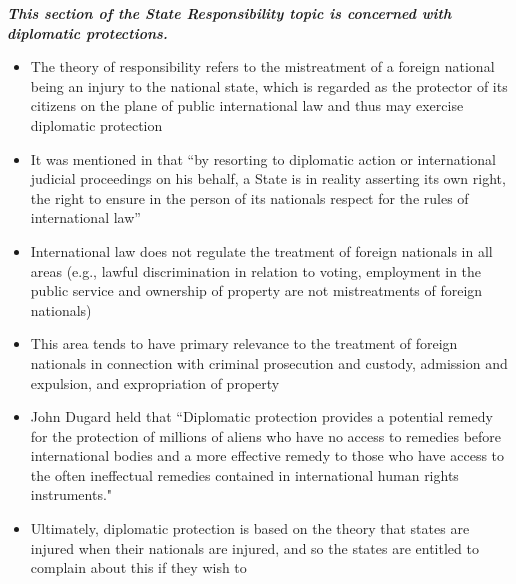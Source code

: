 \begin{tcolorbox}
    \textbf{\textit{This section of the State Responsibility topic is concerned with diplomatic protections.}}
\end{tcolorbox}

\begin{itemize}
    \item The theory of responsibility refers to the mistreatment of a foreign national being an injury to the national state, which is regarded as the protector of its citizens on the plane of public international law and thus may exercise diplomatic protection
    \item It was mentioned in  that ``by resorting to diplomatic action or international judicial proceedings on his behalf, a State is in reality asserting its own right, the right to ensure in the person of its nationals respect for the rules of international law''
    \item International law does not regulate the treatment of foreign nationals in all areas (e.g., lawful discrimination in relation to voting, employment in the public service and ownership of property are not mistreatments of foreign nationals)
    \item This area tends to have primary relevance to the treatment of foreign nationals in connection with criminal prosecution and custody, admission and expulsion, and expropriation of property
    \item John Dugard held that ``Diplomatic protection provides a potential remedy for the protection of millions of aliens who have no access to remedies before international bodies and a more effective remedy to those who have access to the often ineffectual remedies contained in international human rights instruments."
    \item Ultimately, diplomatic protection is based on the theory that states are injured when their nationals are injured, and so the states are entitled to complain about this if they wish to
\end{itemize}

